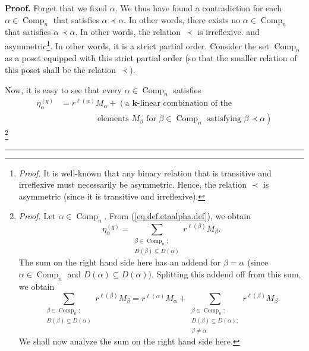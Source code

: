 \documentclass[numbers=enddot,12pt,final,onecolumn,notitlepage]{scrartcl}%
\theoremstyle{definition}
\newenvironment{proof}[1][Proof]{\noindent\textbf{#1.} }{\ \rule{0.5em}{0.5em}}
\let\sumnonlimits\sum
\renewcommand{\sum}{\sumnonlimits\limits}
\newenvironment{verlong}{}{}
\begin{document}
\begin{verlong}
\begin{proof}
{Forget that we fixed $\alpha$. We thus have found a contradiction for each
$\alpha\in\operatorname*{Comp}\nolimits_{n}$ that satisfies $\alpha\prec
\alpha$. In other words, there exists no $\alpha\in\operatorname*{Comp}%
\nolimits_{n}$ that satisfies $\alpha\prec\alpha$. In other words, the
relation $\prec$ is irreflexive.} and asymmetric\footnote{\textit{Proof.} It
is well-known that any binary relation that is transitive and irreflexive must
necessarily be asymmetric. Hence, the relation $\prec$ is asymmetric (since it
is transitive and irreflexive).}. In other words, it is a strict partial
order. Consider the set $\operatorname*{Comp}\nolimits_{n}$ as a poset
equipped with this strict partial order (so that the smaller relation of this
poset shall be the relation $\prec$).

Now, it is easy to see that every $\alpha\in\operatorname*{Comp}\nolimits_{n}$
satisfies%
\begin{align*}
\eta_{\alpha}^{\left(  q\right)  }  &  =r^{\ell\left(  \alpha\right)
}M_{\alpha}+\left(  \text{a }\mathbf{k}\text{-linear combination of
the}\right. \\
&  \ \ \ \ \ \ \ \ \ \ \ \ \ \ \ \ \ \ \ \ \left.  \text{elements }M_{\beta
}\text{ for }\beta\in\operatorname*{Comp}\nolimits_{n}\text{ satisfying }%
\beta\prec\alpha\right)
\end{align*}
\footnote{\textit{Proof.} Let $\alpha\in\operatorname*{Comp}\nolimits_{n}$.
From (\ref{eq.def.etaalpha.def}), we obtain%
\[
\eta_{\alpha}^{\left(  q\right)  }=\sum_{\substack{\beta\in
\operatorname*{Comp}\nolimits_{n};\\D\left(  \beta\right)  \subseteq D\left(
\alpha\right)  }}r^{\ell\left(  \beta\right)  }M_{\beta}.
\]
The sum on the right hand side here has an addend for $\beta=\alpha$ (since
$\alpha\in\operatorname*{Comp}\nolimits_{n}$ and $D\left(  \alpha\right)
\subseteq D\left(  \alpha\right)  $). Splitting this addend off from this sum,
we obtain%
\[
\sum_{\substack{\beta\in\operatorname*{Comp}\nolimits_{n};\\D\left(
\beta\right)  \subseteq D\left(  \alpha\right)  }}r^{\ell\left(  \beta\right)
}M_{\beta}=r^{\ell\left(  \alpha\right)  }M_{\alpha}+\sum_{\substack{\beta
\in\operatorname*{Comp}\nolimits_{n};\\D\left(  \beta\right)  \subseteq
D\left(  \alpha\right)  ;\\\beta\neq\alpha}}r^{\ell\left(  \beta\right)
}M_{\beta}.
\]
We shall now analyze the sum on the right hand side here.
\par
}
\end{proof}
\end{verlong}
\end{document}
